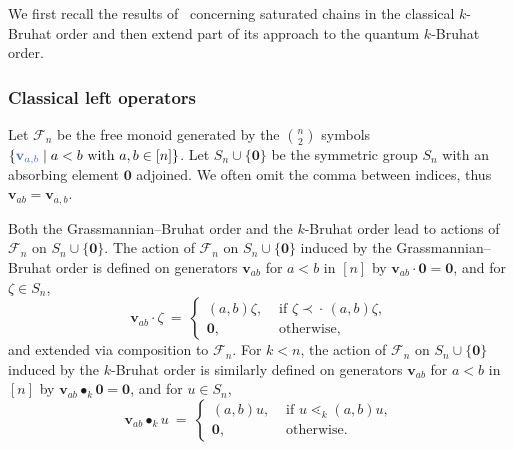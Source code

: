 \documentclass[12pt,oneside,reqno]{amsart}
\theoremstyle{definition}
\numberwithin{equation}{section}
\newcommand{\calF}{{\mathcal F}}
\newcommand{\qv}{{\mathbf v}}
\newcommand{\bzero}{{\mathbf 0}}
\newcommand{\precdot}{{\prec\!\!\!\cdot\,}}
\DeclareMathOperator{\kactionop}{{\scriptstyle \bullet}}
\newcommand{\kaction}[1][k]{\kactionop_{#1}}
\newcommand{\defcolor}[1]{{\color{RoyalBlue}#1}}
\begin{document}
We first recall the results of~\cite{BS-Monoid} concerning saturated chains in the classical $k$-Bruhat order
and then extend part of its approach to the quantum $k$-Bruhat order.

\subsubsection{Classical left operators}
\label{SS:classical-left-operators}

Let \defcolor{$\calF_n$} be the free monoid generated by the $\binom{n}{2}$ symbols
$\{\defcolor{\qv_{a,b}} \mid a<b \mbox{ with }a,b\in[n]\}$.
Let \defcolor{$S_n\cup\{\bzero\}$} be the symmetric group $S_n$ with an
absorbing element \defcolor{$\bzero$} adjoined.
We often omit the comma between indices, thus
$\qv_{ab}=\qv_{a,b}$.

Both the Grassmannian--Bruhat order and the $k$-Bruhat order lead to actions of
$\calF_n$ on $S_n\cup\{\bzero\}$.
The \defcolor{action of $\calF_n$ on $S_n\cup\{\bzero\}$ induced by the
Grassmannian--Bruhat order} is defined on generators $\qv_{ab}$ for $a<b$ in $[n]$ by $\qv_{ab}\cdot\bzero=\bzero$, and for
$\zeta\in S_n$, 
%
\begin{equation*}
   \qv_{ab} \cdot \zeta\ =\ \begin{cases}
            (a,b) \zeta, & \text{ if }\zeta\precdot (a,b)\zeta,\\
            \bzero,& \text{ otherwise,}
       \end{cases}
\end{equation*}
%
and extended via composition to $\calF_n$.
For $k< n$, the \defcolor{action of $\calF_n$ on
$S_n\cup\{\bzero\}$ induced by the $k$-Bruhat order} is similarly defined  on generators $\qv_{ab}$ for
$a<b$ in $[n]$ by $\qv_{ab}\kaction\bzero=\bzero$, and for $u\in S_n$,
\begin{equation*}
   \qv_{ab}\kaction u\ =\ \begin{cases}
            (a,b) u, & \text{ if }u \lessdot_k (a,b)u,\\
            \bzero,& \text{ otherwise.}
       \end{cases}
\end{equation*}
\end{document}

